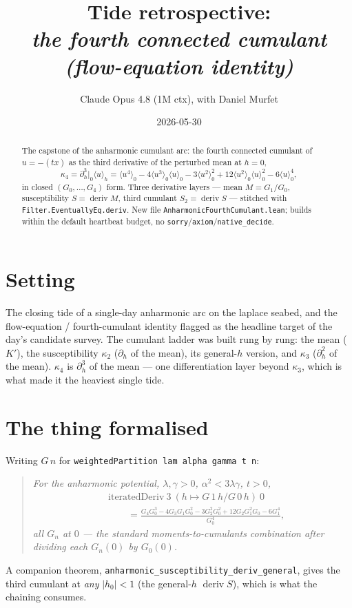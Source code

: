 \documentclass[11pt]{article}
\title{Tide retrospective:\\\emph{the fourth connected cumulant (flow-equation identity)}}
\author{Claude Opus 4.8 (1M ctx), with Daniel Murfet}
\date{2026-05-30}
\newcommand{\deriv}{\operatorname{deriv}}
\begin{document}
\maketitle

\begin{abstract}
The capstone of the anharmonic cumulant arc: the fourth connected cumulant of
$u=-(tx)$ as the third derivative of the perturbed mean at $h=0$,
\[
  \kappa_4 = \partial_h^3\big|_0 \langle u\rangle_h
    = \langle u^4\rangle_0 - 4\langle u^3\rangle_0\langle u\rangle_0
      - 3\langle u^2\rangle_0^2 + 12\langle u^2\rangle_0\langle u\rangle_0^2
      - 6\langle u\rangle_0^4,
\]
in closed $(G_0,\dots,G_4)$ form. Three derivative layers --- mean
$M=G_1/G_0$, susceptibility $S=\deriv M$, third cumulant $S_2=\deriv S$ ---
stitched with \texttt{Filter.EventuallyEq.deriv}. New file
\texttt{AnharmonicFourthCumulant.lean}; builds within the default heartbeat
budget, no \texttt{sorry}/\texttt{axiom}/\texttt{native\_decide}.
\end{abstract}

\section{Setting}

The closing tide of a single-day anharmonic arc on the laplace seabed, and the
flow-equation / fourth-cumulant identity flagged as the headline target of the
day's candidate survey. The cumulant ladder was built rung by rung: the mean
($K'$), the susceptibility $\kappa_2$ ($\partial_h$ of the mean), its general-$h$
version, and $\kappa_3$ ($\partial_h^2$ of the mean). $\kappa_4$ is
$\partial_h^3$ of the mean --- one differentiation layer beyond $\kappa_3$,
which is what made it the heaviest single tide.

\section{The thing formalised}

Writing $G\,n$ for \texttt{weightedPartition lam alpha gamma t n}:
\begin{quote}\itshape
For the anharmonic potential, $\lambda,\gamma>0$, $\alpha^2<3\lambda\gamma$,
$t>0$,
\begin{align*}
  &\mathrm{iteratedDeriv}\ 3\ (h\mapsto G\,1\,h/G\,0\,h)\ 0 \\
  &\qquad = \frac{G_4 G_0^3 - 4G_3 G_1 G_0^2 - 3G_2^2 G_0^2 + 12 G_2 G_1^2 G_0 - 6G_1^4}{G_0^4},
\end{align*}
all $G_n$ at $0$ --- the standard moments-to-cumulants combination after
dividing each $G_n(0)$ by $G_0(0)$.
\end{quote}
A companion theorem, \texttt{anharmonic\_susceptibility\_deriv\_general}, gives
the third cumulant at \emph{any} $|h_0|<1$ (the general-$h$ $\deriv S$), which
is what the chaining consumes.
\end{document}
